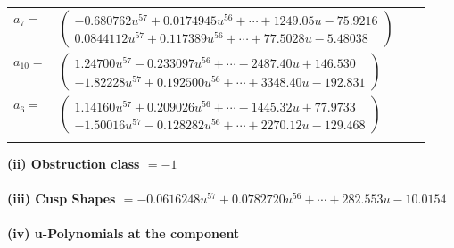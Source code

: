 \documentclass[1p]{elsarticle_modified}
\theoremstyle{definition}
\begin{document}
\begin{tabular}{m{7pt} m{180pt} m{7pt} m{180pt} }
\flushright $a_{7}=$&$\begin{pmatrix}-0.680762 u^{57}+0.0174945 u^{56}+\cdots+1249.05 u-75.9216\\0.0844112 u^{57}+0.117389 u^{56}+\cdots+77.5028 u-5.48038\end{pmatrix}$ \\
\flushright $a_{10}=$&$\begin{pmatrix}1.24700 u^{57}-0.233097 u^{56}+\cdots-2487.40 u+146.530\\-1.82228 u^{57}+0.192500 u^{56}+\cdots+3348.40 u-192.831\end{pmatrix}$ \\
\flushright $a_{6}=$&$\begin{pmatrix}1.14160 u^{57}+0.209026 u^{56}+\cdots-1445.32 u+77.9733\\-1.50016 u^{57}-0.128282 u^{56}+\cdots+2270.12 u-129.468\end{pmatrix}$\\&\end{tabular}
\flushleft \textbf{(ii) Obstruction class $= -1$}\\~\\
\flushleft \textbf{(iii) Cusp Shapes $= -0.0616248 u^{57}+0.0782720 u^{56}+\cdots+282.553 u-10.0154$}\\~\\
\newpage\renewcommand{\arraystretch}{1}
\flushleft \textbf{(iv) u-Polynomials at the component}\newline \\
\end{document}
